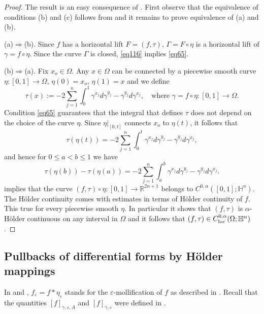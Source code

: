 \documentclass[intlimits,12pt,reqno]{amsart}
\newcommand{\bbbh}{\mathbb H}
\newcommand{\R}{\mathbb R}
\newcommand{\eps}{\varepsilon}
\numberwithin{equation}{section}
\theoremstyle{definition}
\begin{document}
\begin{proof}
The result is an easy consequence of . 
First observe that the equivalence of conditions (b) and (c) follows from  and it remains to prove equivalence of (a) and (b).

\noindent 
(a)$\Rightarrow$(b). Since $f$ has a horizontal lift $F=(f,\tau)$, $\Gamma=F\circ\eta$ is a horizontal lift of $\gamma=f\circ\eta$. Since the curve $\Gamma$ is closed, \eqref{eq116} implies \eqref{eq65}.

\noindent 
(b)$\Rightarrow$(a).
Fix $x_o\in \Omega$. Any $x\in\Omega$ can be connected by a piecewise smooth curve $\eta:[0,1]\to\Omega$, $\eta(0)=x_o$, $\eta(1)=x$
and we define 
$$
\tau(x):=-2\sum_{j=1}^n\int_0^1\gamma^{x_j}d\gamma^{y_j}-\gamma^{y_j}d\gamma^{x_j},
\quad
\text{where } \gamma=f\circ\eta:[0,1]\to\Omega.
$$
Condition \eqref{eq65} guarantees that the integral that defines $\tau$ does not depend on the choice of the curve $\eta$. Since $\eta|_{[0,t]}$ connects $x_o$ to $\eta(t)$, it follows that
$$
\tau(\eta(t))=-2\sum_{j=1}^n\int_0^t\gamma^{x_j}d\gamma^{y_j}-\gamma^{y_j}d\gamma^{x_j},
$$
and hence for $0\leq a<b\leq 1$ we have
$$
\tau(\eta(b))-\tau(\eta(a))=-2\sum_{j=1}^n\int_a^b\gamma^{x_j}d\gamma^{y_j}-\gamma^{y_j}d\gamma^{x_j}.
$$
 implies that the curve $(f,\tau)\circ\eta:[0,1]\to\R^{2n+1}$ belongs to $C^{0,\alpha}([0,1];\bbbh^n)$. The H\"older continuity comes with estimates in terms of H\"older continuity of $f$. 
This true for every piecewise smooth $\eta$. In particular it shows that $(f,\tau)$ is $\alpha$-H\"older continuous on any interval in $\Omega$ and it follows that $(f,\tau)\in C^{0,\alpha}_{\rm loc}(\Omega;\bbbh^n)$. \end{proof}






\subsection{Pullbacks of differential forms by H\"older mappings}
\label{S3}
In  and ,
$f_\eps=f*\eta_\eps$ stands for the  $\eps$-mollification of $f$ as described in .
Recall that the quantities $[f]_{\gamma,\eps,A}$ and $[f]_{\gamma,\eps}$ were defined in .
 
\end{document}
